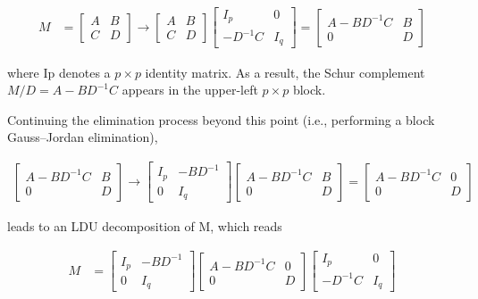\documentclass[11pt]{article} %
\begin{document}
\begin{align*}
	M &= \begin{bmatrix}
		A & B \\
		C & D
	\end{bmatrix} \rightarrow \begin{bmatrix}
	A & B \\
	C & D
\end{bmatrix} \begin{bmatrix}
I_{p} & 0 \\
-D^{-1}C & I_{q}
\end{bmatrix} = \begin{bmatrix}
A - BD^{-1}C & B \\
0 & D
\end{bmatrix}
\end{align*}

where Ip denotes a $p \times p$ identity matrix. As a result, the Schur complement $ M/D=A-BD^{-1}C$ appears in the upper-left $p \times p$ block.

Continuing the elimination process beyond this point (i.e., performing a block Gauss–Jordan elimination),

\begin{align*}
\begin{bmatrix}
		A - BD^{-1}C & B \\
		0 & D
	\end{bmatrix} \rightarrow \begin{bmatrix}
	I_{p} & -BD^{-1} \\
	0 & I_{q}
\end{bmatrix} \begin{bmatrix}
A - BD^{-1}C & B \\
0 & D
\end{bmatrix} = \begin{bmatrix}
A - BD^{-1}C & 0 \\
0 & D
\end{bmatrix} 
\end{align*}

leads to an LDU decomposition of M, which reads

\begin{align*}
	M &= \begin{bmatrix}
	I_{p} & -BD^{-1} \\
	0 & I_{q}
\end{bmatrix}  \begin{bmatrix}
		A - BD^{-1}C & 0 \\
		0 & D
	\end{bmatrix}  \begin{bmatrix}
	I_{p} & 0 \\
	-D^{-1}C & I_{q}
\end{bmatrix}
\end{align*}
\end{document}
